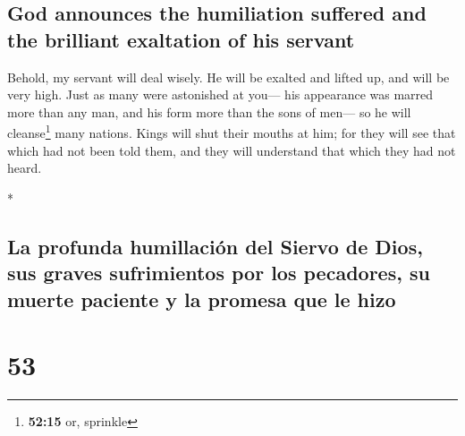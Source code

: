 \begin{paracol}{2}
\begin{otherlanguage}{english}
\hypertarget{god-announces-the-humiliation-suffered-and-the-brilliant-exaltation-of-his-servant}{%
\subsection{God announces the humiliation suffered and the brilliant
exaltation of his
servant}\label{god-announces-the-humiliation-suffered-and-the-brilliant-exaltation-of-his-servant}}

 Behold, my servant will deal wisely. He will be exalted
and lifted up, and will be very high.  Just as many were
astonished at you--- his appearance was marred more than any man, and
his form more than the sons of men---  so he will
cleanse\footnote{\textbf{52:15} or, sprinkle} many nations. Kings will
shut their mouths at him; for they will see that which had not been told
them, and they will understand that which they had not heard.

\end{otherlanguage}

\switchcolumn[0]*

\hypertarget{la-profunda-humillaciuxf3n-del-siervo-de-dios-sus-graves-sufrimientos-por-los-pecadores-su-muerte-paciente-y-la-promesa-que-le-hizo}{%
\subsection{La profunda humillación del Siervo de Dios, sus graves
sufrimientos por los pecadores, su muerte paciente y la promesa que le
hizo}\label{la-profunda-humillaciuxf3n-del-siervo-de-dios-sus-graves-sufrimientos-por-los-pecadores-su-muerte-paciente-y-la-promesa-que-le-hizo}}

\hypertarget{section-104}{%
\section{53}\label{section-104}}


\end{paracol}
